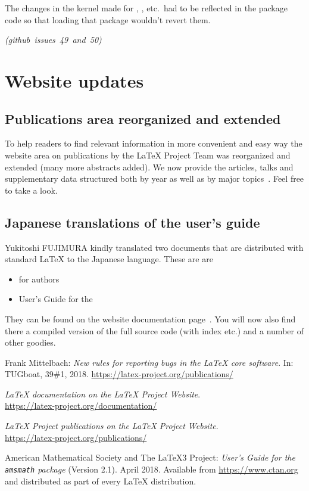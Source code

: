 \documentclass{ltnews}
\newcommand\githubissue[2][]{\ifhmode\unskip\fi
     \quad\penalty500\strut\nobreak\hfill
     \mbox{\small\itshape(github issue#1 #2)}\par}
\begin{document}
The changes in the kernel made for , ,
etc.\ had to be reflected in the  package code so that
loading that package wouldn't revert them.
%
\githubissue[s]{49 and 50}





\section{Website updates}

\subsection{Publications area reorganized and extended}

To help readers to find relevant information in more convenient and
easy way the website area on publications by the \LaTeX{} Project Team
was reorganized and extended (many more abstracts added). We now
provide the articles, talks and supplementary data structured both by
year as well as by major topics~\cite{site-pub}. Feel free to take a
look.

\subsection{Japanese translations of the user's guide}

Yukitoshi FUJIMURA kindly translated two documents that are
distributed with standard \LaTeX{} to the Japanese language. These are
are
\begin{itemize}
\item
    \LaTeXe{} for authors
\item
    User’s Guide for the ~\cite{amsldoc}
\end{itemize}
They can be found on the website documentation page~\cite{site-doc}.
You will now also find there a compiled version of the full \LaTeXe{}
source code (with index etc.\@) and a number of other goodies.


      

\begin{thebibliography}{9}
  
 Frank Mittelbach:
  \emph{New rules for reporting bugs in the \LaTeX{} core software}.  
  In: TUGboat, 39\#1, 2018.
  \url{https://latex-project.org/publications/}

  \emph{\LaTeX{} documentation on the \LaTeX{} Project Website}.\\  
  \url{https://latex-project.org/documentation/}

  \emph{\LaTeX{} Project publications on the \LaTeX{} Project Website}.\\
  \url{https://latex-project.org/publications/}

 American Mathematical Society and The \LaTeX3 Project:
  \emph{User's Guide for the \texttt{amsmath} package} (Version 2.1).  
  April 2018.
  Available from
  \url{https://www.ctan.org}
  and distributed as part of every \LaTeX{} distribution.

\end{thebibliography}
\end{document}
